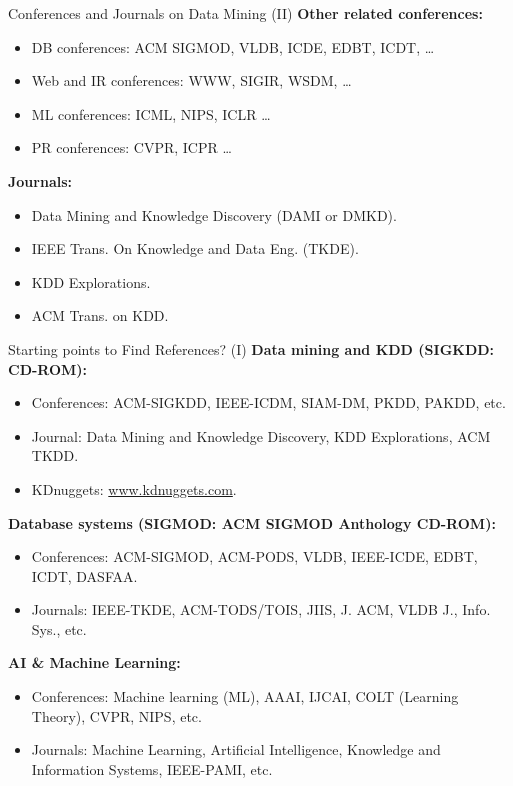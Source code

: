 \begin{frame}{Conferences and Journals on Data Mining (II)}
	\textbf{Other related conferences:}
	\begin{itemize}
		\item DB conferences: ACM SIGMOD, VLDB, ICDE, EDBT, ICDT, \ldots
		\item Web and IR conferences: WWW, SIGIR, WSDM, \ldots
		\item ML conferences: ICML, NIPS, ICLR \ldots
		\item PR conferences: CVPR, ICPR \ldots
	\end{itemize}
	\textbf{Journals:}
	\begin{itemize}
		\item Data Mining and Knowledge Discovery (DAMI or DMKD).
		\item IEEE Trans. On Knowledge and Data Eng. (TKDE).
		\item KDD Explorations.
		\item ACM Trans. on KDD.
	\end{itemize}
\end{frame}

\begin{frame}{Starting points to Find References? (I)}
	\textbf{Data mining and KDD (SIGKDD: CD-ROM):}
	\begin{itemize}
		\item Conferences: ACM-SIGKDD, IEEE-ICDM, SIAM-DM, PKDD, PAKDD, etc.
		\item Journal: Data Mining and Knowledge Discovery, KDD Explorations, 
		ACM TKDD.
		\item KDnuggets: \url{www.kdnuggets.com}.
	\end{itemize}
	\textbf{Database systems (SIGMOD: ACM SIGMOD Anthology CD-ROM):}
	\begin{itemize}
		\item Conferences: ACM-SIGMOD, ACM-PODS, VLDB, IEEE-ICDE, EDBT, ICDT, 
		DASFAA.
		\item Journals: IEEE-TKDE, ACM-TODS/TOIS, JIIS, J. ACM, VLDB J., Info. 
		Sys., etc.
	\end{itemize}
	\textbf{AI \& Machine Learning:}
	\begin{itemize}
		\item Conferences: Machine learning (ML), AAAI, IJCAI, COLT (Learning 
		Theory), CVPR, NIPS, etc.
		\item Journals: Machine Learning, Artificial Intelligence, Knowledge 
		and Information Systems, IEEE-PAMI, etc.
	\end{itemize}
\end{frame}

